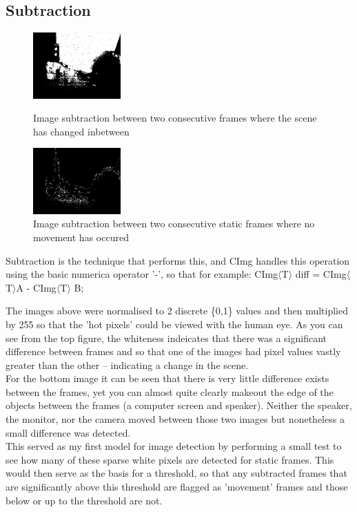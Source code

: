 \subsection{Subtraction}
\begin{figure}
	\vspace{-40pt}
	\begin{center}
		\includegraphics[width=0.3\textwidth]{../images/subG}
	\end{center}
	\vspace{-20pt}
	\caption{Image subtraction between two consecutive frames where the scene has changed inbetween}
	\vspace{10pt}
	\begin{center}
		\includegraphics[width=0.3\textwidth]{../images/subF}
	\end{center}
	\vspace{-20pt}
	\caption{Image subtraction between two consecutive static frames where no movement has occured}
\end{figure}
Subtraction is the technique that performs this, and CImg handles this operation using the basic numerica operator '-', so that for example: CImg\(\langle\)T\(\rangle\) diff = CImg\(\langle\)T\(\rangle\)A - CImg\(\langle\)T\(\rangle\) B;

The images above were normalised to 2 discrete \{0,1\} values and then multiplied by 255 so that the 'hot pixels' could be viewed with the human eye. As you can see from the top figure, the whiteness indeicates that there was a significant difference between frames and so that one of the images had pixel values vastly greater than the other -- indicating a change in the scene.
\\For the bottom image it can be seen that there is very little difference exists between the frames, yet you can almost quite clearly makeout the edge of the objects between the frames (a computer screen and speaker). Neither the speaker, the monitor, nor the camera moved between those two images but nonetheless a small difference was detected.\\
This served as my first model for image detection by performing a small test to see how many of these sparse white pixels are detected for static frames. This would then serve as the basis for a threshold, so that any subtracted frames that are significantly above this threshold are flagged as 'movement' frames and those below or up to the threshold 
are not.
\pagebreak
